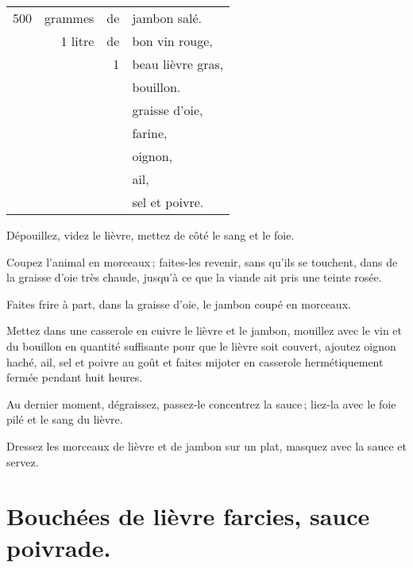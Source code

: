 \footnotesize
\begin{longtable}{rrrp{16em}}
    500 & grammes & de & jambon salé.                                                                     \\
        & 1 litre & de & bon vin rouge,                                                                   \\
        &         &  1 & beau lièvre gras,                                                                \\
        &         &    & bouillon.                                                                        \\
        &         &    & graisse d'oie,                                                                   \\
        &         &    & farine,                                                                          \\
        &         &    & oignon,                                                                          \\
        &         &    & ail,                                                                             \\
        &         &    & sel et poivre.                                                                   \\
\end{longtable}
\normalsize

Dépouillez, videz le lièvre, mettez de côté le sang et le foie.

Coupez l'animal en morceaux ; faites-les revenir, sans qu'ils se touchent, dans
de la graisse d'oie très chaude, jusqu'à ce que la viande ait pris une teinte
rosée.

Faites frire à part, dans la graisse d'oie, le jambon coupé en morceaux.

Mettez dans une casserole en cuivre le lièvre et le jambon, mouillez avec le vin
et du bouillon en quantité suffisante pour que le lièvre soit couvert, ajoutez oignon
haché, ail, sel et poivre au goût et faites mijoter en casserole hermétiquement
fermée pendant huit heures.

Au dernier moment, dégraissez, passez-le concentrez la sauce ; liez-la avec le
foie pilé et le sang du lièvre.

Dressez les morceaux de lièvre et de jambon sur un plat, masquez avec la sauce
et servez.

\section*{\centering Bouchées de lièvre farcies, sauce poivrade.}
{}

